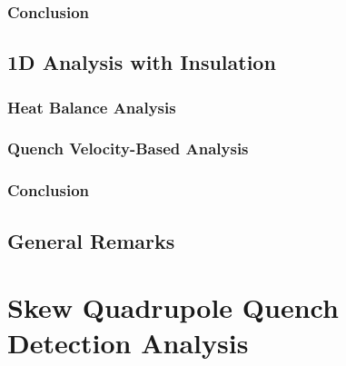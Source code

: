 \documentclass{article}
\begin{document}
\subsubsection{Conclusion}


\subsection{1D Analysis with Insulation}
\label{subsection:quench_velocity_benchmarking_with_insulation}

\subsubsection{Heat Balance Analysis}
\label{subsection:quench_velocity_benchmarking_with_insulation_heat_balance}


\subsubsection{Quench Velocity-Based Analysis}
\label{subsection:quench_velocity_benchmarking_with_insulation_quench_velocity}


\subsubsection{Conclusion}


\subsection{General Remarks}



\clearpage
\section{Skew Quadrupole Quench Detection Analysis}
\label{section:skew_quadrupole_quench_detection_analysis}
% 

% 
\end{document}
